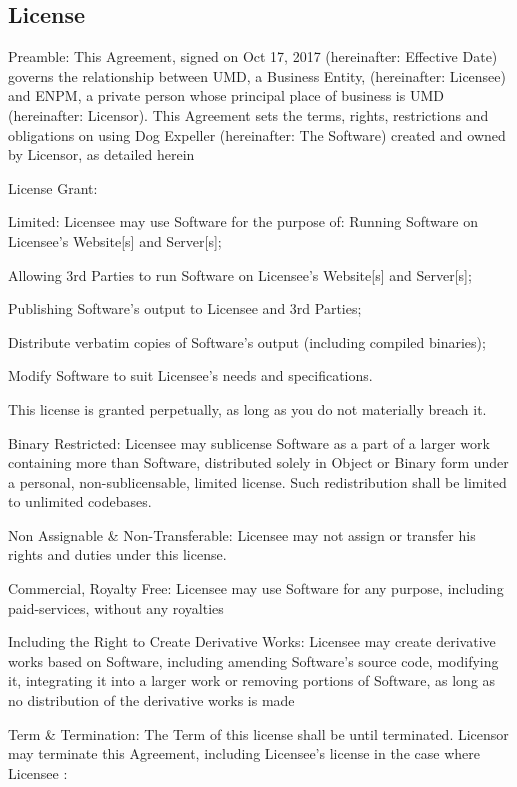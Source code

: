 \subsection*{License}


\begin{DoxyItemize}
\item Preamble\+: This Agreement, signed on Oct 17, 2017 (hereinafter\+: Effective Date) governs the relationship between U\+MD, a Business Entity, (hereinafter\+: Licensee) and E\+N\+PM, a private person whose principal place of business is U\+MD (hereinafter\+: Licensor). This Agreement sets the terms, rights, restrictions and obligations on using Dog Expeller (hereinafter\+: The Software) created and owned by Licensor, as detailed herein
\item License Grant\+:

Limited\+: Licensee may use Software for the purpose of\+: Running Software on Licensee’s Website\mbox{[}s\mbox{]} and Server\mbox{[}s\mbox{]};

Allowing 3rd Parties to run Software on Licensee’s Website\mbox{[}s\mbox{]} and Server\mbox{[}s\mbox{]};

Publishing Software’s output to Licensee and 3rd Parties;

Distribute verbatim copies of Software’s output (including compiled binaries);

Modify Software to suit Licensee’s needs and specifications.

This license is granted perpetually, as long as you do not materially breach it.

Binary Restricted\+: Licensee may sublicense Software as a part of a larger work containing more than Software, distributed solely in Object or Binary form under a personal, non-\/sublicensable, limited license. Such redistribution shall be limited to unlimited codebases.

Non Assignable \& Non-\/\+Transferable\+: Licensee may not assign or transfer his rights and duties under this license.

Commercial, Royalty Free\+: Licensee may use Software for any purpose, including paid-\/services, without any royalties

Including the Right to Create Derivative Works\+: Licensee may create derivative works based on Software, including amending Software’s source code, modifying it, integrating it into a larger work or removing portions of Software, as long as no distribution of the derivative works is made
\item Term \& Termination\+: The Term of this license shall be until terminated. Licensor may terminate this Agreement, including Licensee’s license in the case where Licensee \+:


\end{DoxyItemize}
